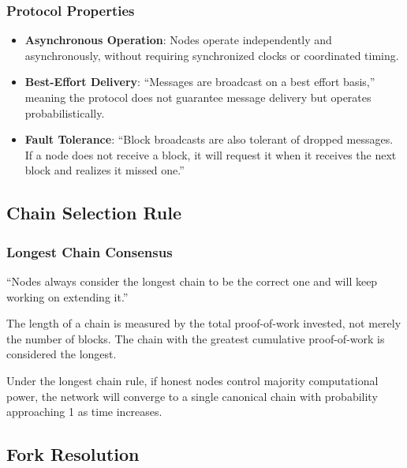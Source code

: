 \subsubsection{Protocol Properties}

\begin{itemize}
  \item \textbf{Asynchronous Operation}: Nodes operate independently and asynchronously, without requiring synchronized clocks or coordinated timing.

  \item \textbf{Best-Effort Delivery}: ``Messages are broadcast on a best effort basis,'' meaning the protocol does not guarantee message delivery but operates probabilistically.

  \item \textbf{Fault Tolerance}: ``Block broadcasts are also tolerant of dropped messages. If a node does not receive a block, it will request it when it receives the next block and realizes it missed one.''
\end{itemize}

\subsection{Chain Selection Rule}
\label{subsec:chain-selection}

\subsubsection{Longest Chain Consensus}

``Nodes always consider the longest chain to be the correct one and will keep working on extending it.''

The length of a chain is measured by the total proof-of-work invested, not merely the number of blocks. The chain with the greatest cumulative proof-of-work is considered the longest.

Under the longest chain rule, if honest nodes control majority computational power, the network will converge to a single canonical chain with probability approaching 1 as time increases.

\subsection{Fork Resolution}
\label{subsec:fork-resolution}

